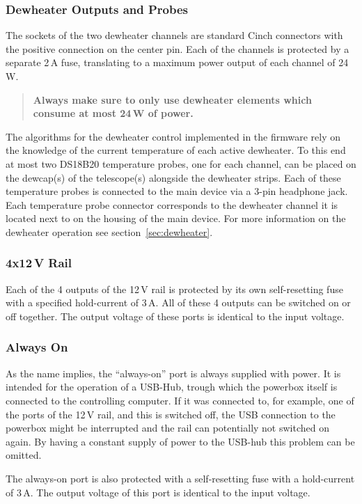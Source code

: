 \documentclass{scrartcl}
\begin{document}
\subsubsection{Dewheater Outputs and Probes}
The sockets of the two dewheater channels are standard Cinch connectors with the
positive connection on the center pin. Each of the channels is protected by a
separate 2\,A fuse, translating to a maximum power output of each channel of
24\,W.
\begin{quote}
  \textbf{
    Always make sure to only use dewheater elements which consume at most 24\,W of
    power.
  }
\end{quote}
The algorithms for the dewheater control implemented in the firmware rely on the
knowledge of the current temperature of each active dewheater. To this end at
most two DS18B20 temperature probes, one for each channel, can be placed on the
dewcap(s) of the telescope(s) alongside the dewheater strips. Each of these
temperature probes is connected to the main device via a 3-pin headphone jack.
Each temperature probe connector corresponds to the dewheater channel it is
located next to on the housing of the main device. For more information on the
dewheater operation see section~\ref{sec:dewheater}.

\subsubsection{4x12\,V Rail}
Each of the 4 outputs of the 12\,V rail is protected by its own self-resetting
fuse with a specified hold-current of 3\,A. All of these 4 outputs can be
switched on or off together. The output voltage of these ports is identical to
the input voltage.

\subsubsection{Always On}
As the name implies, the ``always-on'' port is always supplied with power. It is
intended for the operation of a USB-Hub, trough which the powerbox itself is
connected to the controlling computer. If it was connected to, for example, one
of the ports of the 12\,V rail, and this is switched off, the USB connection to
the powerbox might be interrupted and the rail can potentially not switched on
again. By having a constant supply of power to the USB-hub this problem can be
omitted.

The always-on port is also protected with a self-resetting fuse with a
hold-current of 3\,A. The output voltage of this port is identical to the input
voltage.
\end{document}
